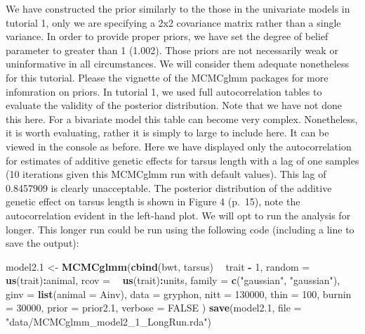 \documentclass[12pt,]{book}
\newenvironment{Shaded}{\begin{snugshade}}{\end{snugshade}}
\newcommand{\DataTypeTok}[1]{\textcolor[rgb]{0.13,0.29,0.53}{#1}}
\newcommand{\DecValTok}[1]{\textcolor[rgb]{0.00,0.00,0.81}{#1}}
\newcommand{\FloatTok}[1]{\textcolor[rgb]{0.00,0.00,0.81}{#1}}
\newcommand{\KeywordTok}[1]{\textcolor[rgb]{0.13,0.29,0.53}{\textbf{#1}}}
\newcommand{\NormalTok}[1]{#1}
\newcommand{\OperatorTok}[1]{\textcolor[rgb]{0.81,0.36,0.00}{\textbf{#1}}}
\newcommand{\OtherTok}[1]{\textcolor[rgb]{0.56,0.35,0.01}{#1}}
\newcommand{\StringTok}[1]{\textcolor[rgb]{0.31,0.60,0.02}{#1}}
\begin{document}
We have constructed the prior similarly to the those in the univariate models in tutorial 1, only we are specifying a 2x2 covariance matrix rather than a single variance. In order to provide proper priors, we have set the degree of belief parameter to greater than 1 (1.002). Those priors are not necessarily weak or uninformative in all circumstances. We will consider them adequate nonetheless for this tutorial. Please the vignette of the MCMCglmm packages \citep{R-MCMCglmm} for more infomration on priors. In tutorial 1, we used full autocorrelation tables to evaluate the validity of the posterior distribution. Note that we have not done this here. For a bivariate model this table can become very complex. Nonetheless, it is worth evaluating, rather it is simply to large to include here. It can be viewed in the console as before. Here we have displayed only the autocorrelation for estimates of additive genetic effects for tarsus length with a lag of one samples (10 iterations given this MCMCglmm run with default values). This lag of 0.8457909 is clearly unacceptable. The posterior distribution of the additive genetic effect on tarsus length is shown in Figure 4 (p.~15), note the autocorrelation evident in the left-hand plot. We will opt to run the analysis for longer. This longer run could be run using the following code (including a line to save the output):

\begin{Shaded}
\begin{Highlighting}[]
\NormalTok{model2}\FloatTok{.1}\NormalTok{ <-}\StringTok{ }\KeywordTok{MCMCglmm}\NormalTok{(}\KeywordTok{cbind}\NormalTok{(bwt, tarsus) }\OperatorTok{~}\StringTok{ }\NormalTok{trait }\OperatorTok{-}\StringTok{ }\DecValTok{1}\NormalTok{,}
  \DataTypeTok{random =} \OperatorTok{~}\StringTok{ }\KeywordTok{us}\NormalTok{(trait)}\OperatorTok{:}\NormalTok{animal,}
  \DataTypeTok{rcov =} \OperatorTok{~}\StringTok{ }\KeywordTok{us}\NormalTok{(trait)}\OperatorTok{:}\NormalTok{units,}
  \DataTypeTok{family =} \KeywordTok{c}\NormalTok{(}\StringTok{"gaussian"}\NormalTok{, }\StringTok{"gaussian"}\NormalTok{),}
  \DataTypeTok{ginv =} \KeywordTok{list}\NormalTok{(}\DataTypeTok{animal =}\NormalTok{ Ainv), }\DataTypeTok{data =}\NormalTok{ gryphon,}
  \DataTypeTok{nitt =} \DecValTok{130000}\NormalTok{, }\DataTypeTok{thin =} \DecValTok{100}\NormalTok{, }\DataTypeTok{burnin =} \DecValTok{30000}\NormalTok{,}
  \DataTypeTok{prior =}\NormalTok{ prior2}\FloatTok{.1}\NormalTok{, }\DataTypeTok{verbose =} \OtherTok{FALSE}
\NormalTok{)}
\KeywordTok{save}\NormalTok{(model2}\FloatTok{.1}\NormalTok{, }\DataTypeTok{file =} \StringTok{"data/MCMCglmm_model2_1_LongRun.rda"}\NormalTok{)}
\end{Highlighting}
\end{Shaded}
\end{document}
